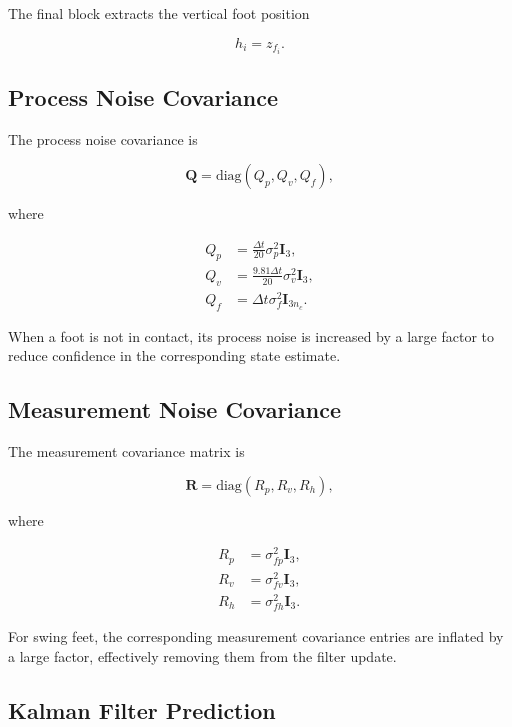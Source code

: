 The final block extracts the vertical foot position

\begin{equation}
h_i
=
z_{f_i}.
\end{equation}

\subsection{Process Noise Covariance}

The process noise covariance is

\begin{equation}
\mathbf{Q}
=
\mathrm{diag}
\left(
Q_p,
Q_v,
Q_f
\right),
\end{equation}

where

\begin{align}
Q_p &= \frac{\Delta t}{20} \sigma_p^2 \mathbf{I}_3,\\
Q_v &= \frac{9.81 \Delta t}{20} \sigma_v^2 \mathbf{I}_3, \\
Q_f &= \Delta t \sigma_f^2 \mathbf{I}_{3n_c}.
\end{align}

When a foot is not in contact, its process noise is increased by a large factor to reduce confidence in the corresponding state estimate.

\subsection{Measurement Noise Covariance}

The measurement covariance matrix is

\begin{equation}
\mathbf{R}
=
\mathrm{diag}
\left(
R_p,
R_v,
R_h
\right),
\end{equation}

where

\begin{align}
R_p &=\sigma_{fp}^2 \mathbf{I}_3, \\
R_v &= \sigma_{fv}^2 \mathbf{I}_3,\\
R_h &= \sigma_{fh}^2 \mathbf{I}_3.
\end{align}

For swing feet, the corresponding measurement covariance entries are inflated by a large factor, effectively removing them from the filter update.

\subsection{Kalman Filter Prediction}

